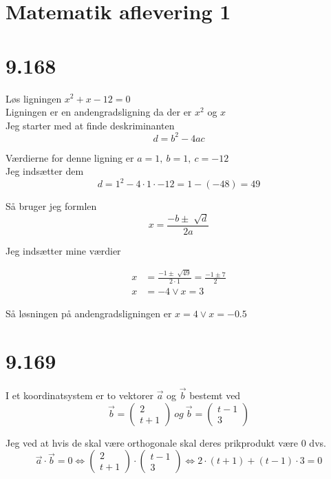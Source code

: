 \section{Matematik aflevering 1}\label{matematik-aflevering-1}

\section{9.168}\label{section}

Løs ligningen \(x^2+x-12=0\)\\
Ligningen er en andengradsligning da der er \(x^2\) og \(x\)\\
Jeg starter med at finde deskriminanten \[d = b^2-4ac\]

Værdierne for denne ligning er \(a = 1,\ b = 1,\ c = -12\)\\
Jeg indsætter dem \[d = 1^2-4 \cdot 1 \cdot -12 = 1-(-48) = 49\]

Så bruger jeg formlen \[x = \frac{-b \pm \sqrt[]{d}}{2a}\]

Jeg indsætter mine værdier

\begin{align*}
x & = \frac{-1 \pm \sqrt[]{49}}{2 \cdot 1} = \frac{-1 \pm 7}{2}\\
x & = -4 \vee x = 3
\end{align*}

Så løsningen på andengradsligningen er \(x = 4 \vee x = -0.5\)

\section{9.169}\label{section-1}

I et koordinatsystem er to vektorer \(\vec{a}\) og \(\vec{b}\) bestemt
ved
\[\vec{b} = \begin{pmatrix} 2 \\ t + 1 \end{pmatrix} \ og \ \vec{b} = \begin{pmatrix} t - 1 \\ 3 \end{pmatrix}\]

Jeg ved at hvis de skal være orthogonale skal deres prikprodukt være
\(0\) dvs.
\[\vec{a} \cdot \vec{b} = 0 \Leftrightarrow \begin{pmatrix} 2 \\ t + 1 \end{pmatrix} \cdot \begin{pmatrix} t - 1 \\ 3 \end{pmatrix} 
\Leftrightarrow 2 \cdot (t + 1) + (t - 1) \cdot 3 = 0\]

